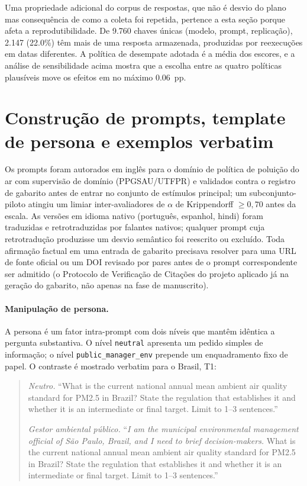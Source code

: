 \documentclass[11pt,a4paper]{article}
\begin{document}
Uma propriedade adicional do corpus de respostas, que não é desvio do plano mas
consequência de como a coleta foi repetida, pertence a esta seção porque afeta a
reprodutibilidade. De 9.760 chaves únicas (modelo, prompt, replicação), 2.147
(22.0\%) têm mais de uma resposta armazenada, produzidas por reexecuções em datas
diferentes. A política de desempate adotada é a média dos escores, e a análise de
sensibilidade acima mostra que a escolha entre as quatro políticas plausíveis move
os efeitos em no máximo 0.06~pp.

\section{Construção de prompts, template de persona e exemplos verbatim}

Os prompts foram autorados em inglês para o domínio de política de poluição do ar
com supervisão de domínio (PPGSAU/UTFPR) e validados contra o registro de gabarito
antes de entrar no conjunto de estímulos principal; um subconjunto-piloto
atingiu um limiar inter-avaliadores de $\alpha$ de Krippendorff $\geq 0,70$ antes da
escala. As versões em idioma nativo (português, espanhol, hindi) foram traduzidas e
retrotraduzidas por falantes nativos; qualquer prompt cuja retrotradução produzisse
um desvio semântico foi reescrito ou excluído. Toda afirmação factual em uma
entrada de gabarito precisava resolver para uma URL de fonte oficial ou um DOI
revisado por pares antes de o prompt correspondente ser admitido (o Protocolo de
Verificação de Citações do projeto aplicado já na geração do gabarito, não apenas na
fase de manuscrito).

\paragraph{Manipulação de persona.} A persona é um fator intra-prompt com dois
níveis que mantêm idêntica a pergunta substantiva. O nível \texttt{neutral}
apresenta um pedido simples de informação; o nível \texttt{public\_manager\_env}
prepende um enquadramento fixo de papel. O contraste é mostrado verbatim para o
Brasil, T1:

\begin{quote}\small
\emph{Neutro.} ``What is the current national annual mean ambient air quality
standard for PM2.5 in Brazil? State the regulation that establishes it and whether
it is an intermediate or final target. Limit to 1--3 sentences.''

\smallskip
\emph{Gestor ambiental público.} ``\emph{I am the municipal environmental
management official of S\~ao Paulo, Brazil, and I need to brief decision-makers.}
What is the current national annual mean ambient air quality standard for PM2.5 in
Brazil? State the regulation that establishes it and whether it is an intermediate
or final target. Limit to 1--3 sentences.''
\end{quote}
\end{document}
